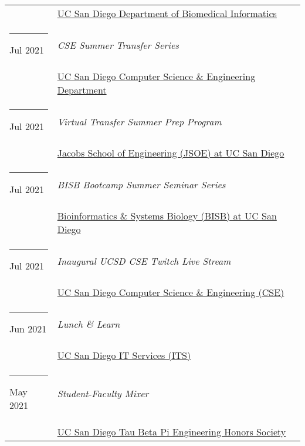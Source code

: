 \documentclass[margin,line]{res}
\begin{document}
\begin{resume}
\begin{longtable}{@{}p{0.7in}p{4in}}
\hspace*{-4mm} & \hspace{4mm} \href{https://dbmi.ucsd.edu/}{UC San Diego Department of Biomedical Informatics}\\
\hspace*{-4mm} \rule{-1mm}{5mm} Jul 2021 & \textit{CSE Summer Transfer Series}\\*
\hspace*{-4mm} & \hspace{4mm} \href{https://cse.ucsd.edu/}{UC San Diego Computer Science \& Engineering Department}\\
\hspace*{-4mm} \rule{-1mm}{5mm} Jul 2021 & \textit{Virtual Transfer Summer Prep Program}\\*
\hspace*{-4mm} & \hspace{4mm} \href{https://jacobsschool.ucsd.edu/}{Jacobs School of Engineering (JSOE) at UC San Diego}\\
\hspace*{-4mm} \rule{-1mm}{5mm} Jul 2021 & \textit{BISB Bootcamp Summer Seminar Series}\\*
\hspace*{-4mm} & \hspace{4mm} \href{https://bioinformatics.ucsd.edu/}{Bioinformatics \& Systems Biology (BISB) at UC San Diego}\\
\hspace*{-4mm} \rule{-1mm}{5mm} Jul 2021 & \textit{Inaugural UCSD CSE Twitch Live Stream}\\*
\hspace*{-4mm} & \hspace{4mm} \href{https://cse.ucsd.edu/}{UC San Diego Computer Science \& Engineering (CSE)}\\
\hspace*{-4mm} \rule{-1mm}{5mm} Jun 2021 & \textit{Lunch \& Learn}\\*
\hspace*{-4mm} & \hspace{4mm} \href{https://its.ucsd.edu}{UC San Diego IT Services (ITS)}\\
\hspace*{-4mm} \rule{-1mm}{5mm} May 2021 & \textit{Student-Faculty Mixer}\\*
\hspace*{-4mm} & \hspace{4mm} \href{https://tbp.ucsd.edu/home}{UC San Diego Tau Beta Pi Engineering Honors Society}\\

\end{longtable}
\end{resume}
\end{document}
